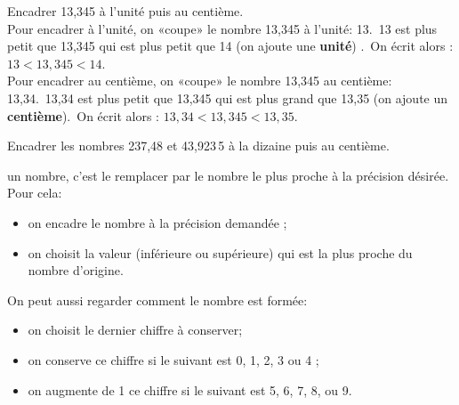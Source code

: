 \begin{methode*1}[Encadrer]

\begin{exemple*1}
Encadrer 13,345 à l'unité puis au centième.\\[0.5em]
Pour encadrer à l'unité, on «coupe» le nombre 13,345 à l'unité: 13.\
13 est plus petit  que 13,345 qui est plus petit que 14 (on ajoute une \textbf{unité}) .\
On écrit alors : $13 < 13,345 < 14$. \\[1em]
Pour encadrer au centième, on «coupe» le nombre 13,345 au centième: 13,34.\
13,34 est plus petit que 13,345 qui est plus grand que 13,35 (on ajoute un \textbf{centième}).\
On écrit alors : $13,34 < 13,345 < 13,35$.
\end{exemple*1}

\exercice

Encadrer les nombres 237,48 et 43,923\,5 à la dizaine puis au centième.

\end{methode*1}



\begin{aconnaitre}
\textbf{\MotDefinition{Arrondir}{}} un nombre, c’est le remplacer par le nombre le plus proche à la précision désirée. Pour cela:
\begin{itemize}
 \item on encadre le nombre à la précision demandée ;
 \item on choisit la valeur (inférieure ou supérieure) qui est la plus proche du nombre d'origine.
 \end{itemize}
 
On peut aussi regarder comment le nombre est formée:
\begin{itemize}
\item on choisit le dernier chiffre à conserver;
 \item on conserve ce chiffre si le suivant est 0, 1, 2, 3 ou 4 ;
 \item on augmente de 1 ce chiffre si le suivant est 5, 6, 7, 8, ou 9.
 \end{itemize}
\end{aconnaitre}


